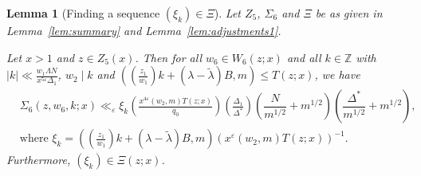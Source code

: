 \documentclass{amsart}
\newtheorem{lemma}{Lemma}
\numberwithin{equation}{section}
\begin{document}
\begin{lemma}[Finding a sequence  $(\xi_k) \in \Xi$]\label{lem:gcdboundssigma6}
 Let $Z_5$, $\Sigma_6$ and $\Xi$ be as given in Lemma~{\rm\ref{lem:summary}} and  Lemma~{\rm\ref{lem:adjustments1}}.  

\vspace{3mm} Let $x>1$ and $z \in Z_5(x)$. Then for all $w_6 \in W_6(z;x)$ and all $k \in \mathbb{Z}$ with   $|k| \ll  \frac{w_1\Lambda N}{x^{5\varepsilon}\Delta_1}$,   
 $w_2 \mid k$  and $((\frac{z_1}{w_1})k+(\lambda-\widetilde{\lambda})B,m) \leq T(z;x)$, we have
\begin{align*}
 &\Sigma_6(z,w_6,k;x) \ll_\varepsilon \xi_k \left(\frac{x^{4\varepsilon} (w_2,m) T(z;x)}{q_0} \right)\left(\frac{\Delta_1}{\Delta^*}\right)\left(\dfrac{N}{m^{1/2}} + m^{1/2} \right)\!\left(\dfrac{\Delta^*}{ m^{1/2} }  + m^{1/2}\right), \\ 
 &\mbox{where } \xi_k = ((\tfrac{z_1}{w_1})k + (\lambda - \widetilde{\lambda})B,m) (x^\varepsilon (w_2,m) T(z;x))^{-1}.
\end{align*}
Furthermore, $(\xi_k) \in \Xi(z;x)$. 
\end{lemma}
\end{document}
